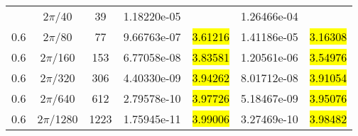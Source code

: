 \begin{table}[htbp]
	\label{ta:1D-ex3-HHC4}
	\centering
	\begin{tabular}{ccccccc}
		\toprule
		\titleintable
		\midrule
		0.6 & $2\pi$/40   & 39   & 1.18220e-05 &              & 1.26466e-04 &              \\
		0.6 & $2\pi$/80   & 77   & 9.66763e-07 & \hl{3.61216} & 1.41186e-05 & \hl{3.16308} \\
		0.6 & $2\pi$/160  & 153  & 6.77058e-08 & \hl{3.83581} & 1.20561e-06 & \hl{3.54976} \\
		0.6 & $2\pi$/320  & 306  & 4.40330e-09 & \hl{3.94262} & 8.01712e-08 & \hl{3.91054} \\
		0.6 & $2\pi$/640  & 612  & 2.79578e-10 & \hl{3.97726} & 5.18467e-09 & \hl{3.95076} \\
		0.6 & $2\pi$/1280 & 1223 & 1.75945e-11 & \hl{3.99006} & 3.27469e-10 & \hl{3.98482} \\
		\bottomrule
	\end{tabular}
\end{table}
\undef\titleintable